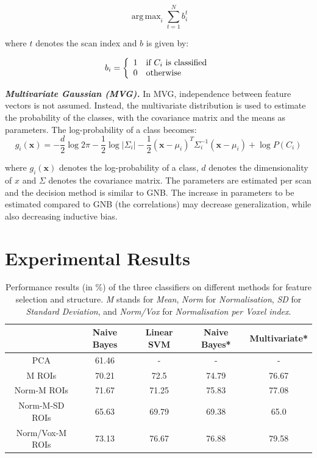 \documentclass[preprint,journal,11pt]{vgtc}
\begin{document}
\begin{equation}
\label{eq:argmaxsvm}
\operatorname{arg\,max}_i \sum_{t=1}^{N}{b_{i}^{t}}
\end{equation}

where $t$ denotes the scan index and $b$ is given by:

\begin{equation}
b_{i} = \left\{
\begin{array}{l l}
1 \quad \text{if $C_{i}$ is classified}\\
0 \quad \text{otherwise}\\
\end{array} \right.
\end{equation}

\textbf{\emph{Multivariate Gaussian (MVG).}} In MVG, independence between feature vectors is not assumed. Instead, the multivariate distribution is used to estimate the probability of the classes, with the covariance matrix and the means as parameters. The log-probability of a class becomes:
\begin{dmath}
\label{eq:multivariate}
g_{i}(\mathbf{x}) = -\frac{d}{2}\log{2\pi}-\frac{1}{2}\log{|\Sigma_{i}|}-\frac{1}{2}(\mathbf{x}-\mu_{i})^{T}\Sigma_{i}^{-1}(\textbf{x}-\mu_{i})+\log{P(C_{i})}
\end{dmath}

where $g_{i}(\mathbf{x})$ denotes the log-probability of a class, $d$ denotes the dimensionality of $x$ and $\Sigma$ denotes the covariance matrix. The parameters are estimated per scan and the decision method is similar to GNB. The increase in parameters to be estimated compared to GNB (the correlations) may decrease generalization, while also decreasing inductive bias.




\section{Experimental Results}
\label{sec:results}

\begin{table}[htpb]
\centering
{\small
\begin{tabular}{c|c|c|c|c}
& \textbf{Naive Bayes} & \textbf{Linear SVM} & \textbf{Naive Bayes*} & \textbf{Multivariate*} \\ \hline
PCA & 61.46 &  - & - & - \\
M ROIs & 70.21 & 72.5 & 74.79 & 76.67 \\
Norm-M ROIs & 71.67 & 71.25 & 75.83 & 77.08 \\
Norm-M-SD ROIs & 65.63 & 69.79 & 69.38 & 65.0 \\
Norm/Vox-M ROIs & 73.13 & 76.67 & 76.88 & 79.58 \\
\end{tabular}}
\caption{Performance results (in \%) of the three classifiers on different methods for feature selection and structure. \emph{M} stands for \emph{Mean}, \emph{Norm} for \emph{Normalisation}, \emph{SD} for \emph{Standard Deviation}, and \emph{Norm/Vox} for \emph{Normalisation per Voxel index}.}
\label{tab:results}
\end{table}
\end{document}

